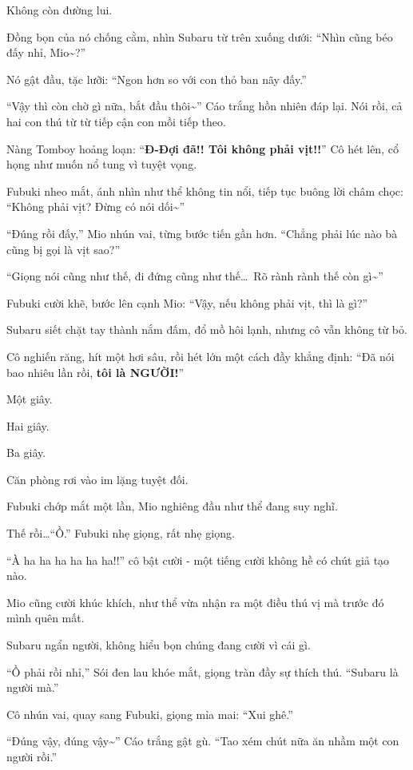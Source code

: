 \documentclass[../main.tex]{subfiles}
\begin{document}
Không còn đường lui.

Đồng bọn của nó chống cằm, nhìn Subaru từ trên xuống dưới: ``Nhìn cũng béo đấy nhỉ, Mio\~{}?''

Nó gật đầu, tặc lưỡi: ``Ngon hơn so với con thỏ ban nãy đấy.''

``Vậy thì còn chờ gì nữa, bắt đầu thôi\~{}'' Cáo trắng hồn nhiên đáp lại. Nói rồi, cả hai con thú từ từ tiếp cận con mồi tiếp theo.

Nàng Tomboy hoảng loạn: ``\textbf{Đ-Đợi đã!! Tôi không phải vịt!!}'' Cô hét lên, cổ họng như muốn nổ tung vì tuyệt vọng.

Fubuki nheo mắt, ánh nhìn như thể không tin nổi, tiếp tục buông lời châm chọc: ``Không phải vịt? Đừng có nói dối\~{}''

``Đúng rồi đấy,'' Mio nhún vai, từng bước tiến gần hơn. ``Chẳng phải lúc nào bà cũng bị gọi là vịt sao?''

``Giọng nói cũng như thế, đi đứng cũng như thế\dots\ Rõ rành rành thế còn gì\~{}''

Fubuki cười khẽ, bước lên cạnh Mio: ``Vậy, nếu không phải vịt, thì là gì?''

Subaru siết chặt tay thành nắm đấm, đổ mồ hôi lạnh, nhưng cô vẫn không từ bỏ.

Cô nghiến răng, hít một hơi sâu, rồi hét lớn một cách đầy khẳng định: ``Đã nói bao nhiêu lần rồi, \textbf{tôi là NGƯỜI!}''

Một giây.

Hai giây.

Ba giây.

Căn phòng rơi vào im lặng tuyệt đối.

Fubuki chớp mắt một lần, Mio nghiêng đầu như thể đang suy nghĩ.

Thế rồi\dots ``Ồ.'' Fubuki nhẹ giọng, rất nhẹ giọng.

``À ha ha ha ha ha ha!!'' cô bật cười - một tiếng cười không hề có chút giả tạo nào.

Mio cũng cười khúc khích, như thể vừa nhận ra một điều thú vị mà trước đó mình quên mất.

Subaru ngẩn người, không hiểu bọn chúng đang cười vì cái gì.

``Ồ phải rồi nhỉ,'' Sói đen lau khóe mắt, giọng tràn đầy sự thích thú. ``Subaru là người mà.''

Cô nhún vai, quay sang Fubuki, giọng mỉa mai: ``Xui ghê.''

``Đúng vậy, đúng vậy\~{}'' Cáo trắng gật gù. ``Tao xém chút nữa ăn nhầm một con người rồi.''
\end{document}

